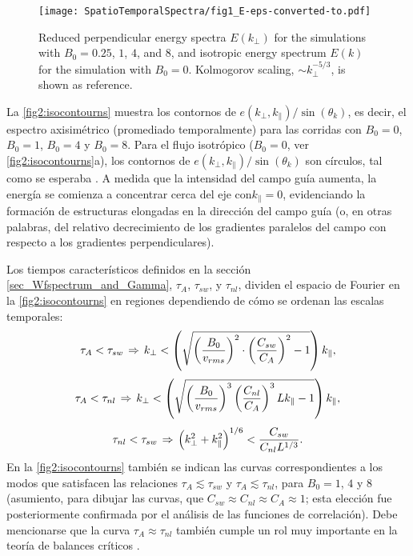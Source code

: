 \begin{figure}
  \centering
  \texttt{[image: SpatioTemporalSpectra/fig1\_E-eps-converted-to.pdf]}
  \caption{Reduced perpendicular energy spectra $E(k_\perp)$ for the
    simulations with $B_0=0.25$, $1$, $4$, and $8$, and isotropic energy
    spectrum $E(k)$ for the simulation with $B_0=0$. Kolmogorov
    scaling, $\sim k_\perp^{-5/3}$, is shown as reference.}
  \label{fig1:E}
\end{figure}


La \cref{fig2:isocontourns} muestra los contornos de
$e(k_\perp,k_\parallel)/\sin(\theta_k)$, es decir, el espectro
axisimétrico (promediado temporalmente) para las corridas con $B_0=0$,
$B_0=1$, $B_0=4$ y $B_0=8$. Para el flujo isotrópico ($B_0=0$, ver
\cref{fig2:isocontourns}a), los contornos de
$e(k_\perp,k_\parallel)/\sin(\theta_k)$ son círculos, tal como se
esperaba \cite{mininni_isotropization_2012}.  A medida que la
intensidad del campo guía aumenta, la energía se comienza a concentrar
cerca del eje con$k_\parallel=0$, evidenciando la formación de
estructuras elongadas en la dirección del campo guía (o, en otras
palabras, del relativo decrecimiento de los gradientes paralelos del
campo con respecto a los gradientes perpendiculares).

Los tiempos característicos definidos en la sección \ref{sec_Wfspectrum_and_Gamma}, $\tau_A$,
$\tau_{sw}$, y $\tau_{nl}$, dividen el espacio de Fourier en la \cref{fig2:isocontourns} en regiones dependiendo de cómo se ordenan las escalas temporales:
\begin{equation}\label{eq:Asw} \tau_A < \tau_{sw} \hspace{0.05cm}
\Rightarrow \hspace{0.05cm} k_\perp <
\left(\sqrt{\left(\frac{B_0}{v_{rms}}\right)^2 \cdot
\left(\frac{C_{sw}}{C_A}\right)^2 - 1} \right) k_\parallel,
\end{equation}
\begin{equation}\label{eq:Anl} \tau_A < \tau_{nl} \hspace{0.05cm}
\Rightarrow \hspace{0.05cm} k_\perp <
\left(\sqrt{\left(\frac{B_0}{v_{rms}}\right)^3
\left(\frac{C_{nl}}{C_A}\right)^3 Lk_\parallel - 1} \right) 
k_\parallel,
\end{equation}
\begin{equation}\label{eq:nlsw} \tau_{nl} < \tau_{sw} \hspace{0.05cm}
\Rightarrow \hspace{0.05cm} \left( k_\perp^2 + k_\parallel^2
\right)^{1/6} < \frac{C_{sw}}{C_{nl}L^{1/3}}.
\end{equation}
En la \cref{fig2:isocontourns} también se indican las curvas
correspondientes a los modos que satisfacen las relaciones
$\tau_A\lesssim\tau_{sw}$ y $\tau_A\lesssim\tau_{nl}$, para $B_0=1$,
$4$ y $8$ (asumiento, para dibujar las curvas, que $C_{sw} \approx
C_{nl} \approx C_A \approx 1$; esta elección fue posteriormente
confirmada por el análisis de las funciones de correlación). Debe
mencionarse que la curva $\tau_A\approx\tau_{nl}$ también cumple un
rol muy importante en la teoría de balances críticos
\cite{sridhar_toward_1994}.

